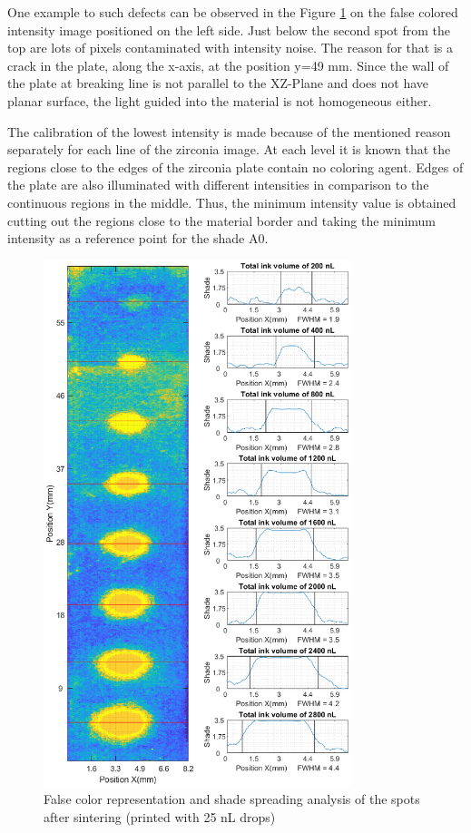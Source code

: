 One example to such defects can be observed in the Figure \ref{fig:drops25} on the false colored intensity image positioned on the left side. Just below the second spot from the top are lots of pixels contaminated with intensity noise. The reason for that is a crack in the plate, along the x-axis, at the position y=49 mm. Since the wall of the plate at breaking line is not parallel to the XZ-Plane and does not have planar surface, the light guided into the material is not homogeneous either. 

The calibration of the lowest intensity is made because of the mentioned reason separately for each line of the zirconia image. At each level it is known that the regions close to the edges of the zirconia plate contain no coloring agent. Edges of the plate are also illuminated with different intensities in comparison to the continuous regions in the middle. Thus, the minimum intensity value is obtained cutting out the regions close to the material border and taking  the minimum intensity as a reference point for the shade A0.
\bigskip

\begin{figure}[H]
	\centering
	\includegraphics[width=0.8\textwidth]{grafiken/drops25.eps}
	\caption{False color representation and shade spreading analysis of the spots after sintering (printed with 25 nL drops)}
	\label{fig:drops25}
\end{figure} 

